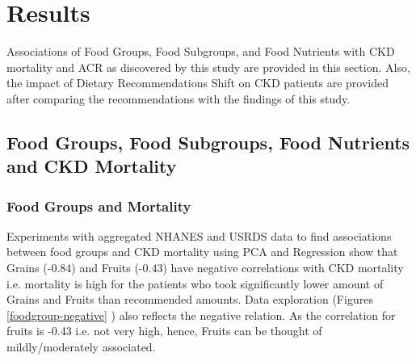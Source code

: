 \section*{Results}
Associations of Food Groups, Food Subgroups, and Food Nutrients with CKD mortality and ACR as discovered by this study are provided in this section. Also, the impact of Dietary Recommendations Shift on CKD patients  are provided after comparing the recommendations with the findings of this study. 

\subsection*{Food Groups, Food Subgroups, Food Nutrients and CKD Mortality}
\subsubsection*{Food Groups and Mortality}
Experiments with aggregated NHANES and USRDS  data to find associations between food groups and CKD mortality using PCA and Regression show that Grains (-0.84) and Fruits (-0.43) have negative correlations with CKD mortality i.e. mortality is high for the patients who took significantly lower amount of Grains and Fruits than recommended amounts. Data exploration (Figures \ref{foodgroup-negative} ) also reflects the negative relation. As the correlation for fruits is -0.43 i.e. not very high, hence, Fruits can be thought of mildly/moderately associated.

